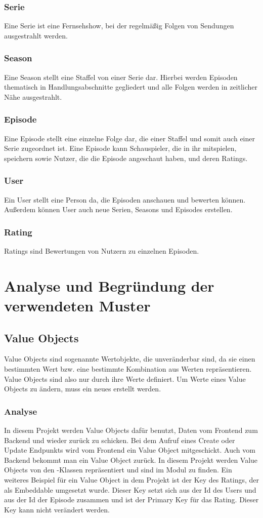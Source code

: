 \subsubsection{Serie}
Eine Serie ist eine Fernsehshow, bei der regelmäßig Folgen von Sendungen ausgestrahlt werden.
\subsubsection{Season}
Eine Season stellt eine Staffel von einer Serie dar. Hierbei werden Episoden thematisch in Handlungsabschnitte gegliedert und alle Folgen werden in zeitlicher Nähe ausgestrahlt.
\subsubsection{Episode}
Eine Episode stellt eine einzelne Folge dar, die einer Staffel und somit auch einer Serie zugeordnet ist. Eine Episode kann Schauspieler, die in ihr mitspielen, speichern sowie Nutzer, die die Episode angeschaut haben, und deren Ratings.
\subsubsection{User}
Ein User stellt eine Person da, die Episoden anschauen und bewerten können. Außerdem können User auch neue Serien, Seasons und Episodes erstellen.
\subsubsection{Rating}
Ratings sind Bewertungen von Nutzern zu einzelnen Episoden.

\section{Analyse und Begründung der verwendeten Muster}

    \subsection{Value Objects} \label{1.vo}
    Value Objects sind sogenannte Wertobjekte, die unveränderbar sind, da sie einen bestimmten Wert bzw. eine bestimmte Kombination aus Werten repräsentieren. Value Objects sind also nur durch ihre Werte definiert. Um Werte eines Value Objects zu ändern, muss ein neues erstellt werden.

        \subsubsection{Analyse}
        In diesem Projekt werden Value Objects dafür benutzt, Daten vom Frontend zum Backend und wieder zurück zu schicken. Bei dem Aufruf eines Create oder Update Endpunkts wird vom Frontend ein Value Object mitgeschickt. Auch vom Backend bekommt man ein Value Object zurück. In diesem Projekt werden Value Objects von den -Klassen repräsentiert und sind im Modul  zu finden.
        Ein weiteres Beispiel für ein Value Object in dem Projekt ist der Key des Ratings, der als Embeddable umgesetzt wurde. Dieser Key setzt sich aus der Id des Users und aus der Id der Episode zusammen und ist der Primary Key für das Rating. Dieser Key kann nicht verändert werden.

